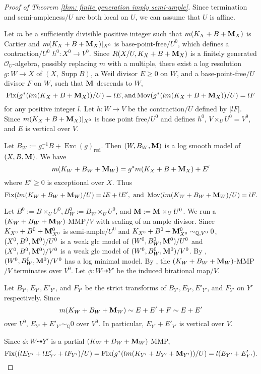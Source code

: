 \documentclass[11pt]{amsart}
\numberwithin{equation}{section}
\newcommand{\Mm}{{\bf{M}}}
\newcommand{\Qq}{\mathbb{Q}}
\newcommand{\Exc}{\operatorname{Exc}}
\newcommand{\Fix}{\operatorname{Fix}}
\newcommand{\Mov}{\operatorname{Mov}}
\newcommand{\Supp}{\operatorname{Supp}}
\newcommand{\Oo}{\mathcal{O}}
\theoremstyle{definition}
\theoremstyle{definition}
\theoremstyle{definition}
\begin{document}
\begin{proof}[Proof of Theorem \ref{thm: finite generation imply semi-ample}]
Since termination and semi-ampleness$/U$ are both local on $U$, we can assume that $U$ is affine.

Let $m$ be a sufficiently divisible positive integer such that $m(K_X+B+\Mm_X)$ is Cartier and $m(K_X+B+\Mm_X)|_{X^0}$ is base-point-free$/U^0$, which defines a contraction$/U^0$ $h^0: X^0\to V^0$. Since $R(X/U,K_X+B+\Mm_X)$ is a finitely
generated $\Oo_U$-algebra, possibly replacing $m$ with a multiple, there
exist a log resolution $g: W\to X$ of $(X,\Supp B)$, a Weil divisor $E\ge 0$ on $W$, and a base-point-free$/U$ divisor $F$ on $W$, such that $\Mm$ descends to $W$,
$$
\Fix(g^*(lm(K_X+B+\Mm_X))/U)=lE, \text{and}  \Mov(g^*(lm(K_X+B+\Mm_X))/U)=lF
$$
for any positive integer $l$. Let $h: W\rightarrow V$ be the
contraction$/U$ defined by $|lF|$. Since $m(K_X+B+\Mm_X)|_{X^0}$ is base point free$/U^0$ and defines $h^0$, $V\times_UU^0=V^0$, and $E$ is vertical over $V$.

Let $B_W:=g^{-1}_*B+\Exc(g)_{\text{red}}$. Then $(W,B_W,\Mm)$ is a log smooth model of $(X,B,\Mm)$. We have
$$
m(K_W+B_W+\Mm_W)=g^*m(K_X+B+\Mm_X)+E'
$$
where $E'\ge0$ is exceptional over $X$. Thus
$$
\Fix(lm(K_W+B_W+\Mm_W)/U)=lE+lE', \text{ and }\Mov(lm(K_W+B_W+\Mm_W)/U)=lF.
$$

Let $B^0:=B\times_UU^0, B_W^0:=B_W\times_UU^0$, and $\Mm:=\Mm\times_UU^0$. We run a $(K_W+B_W+\Mm_W)$-MMP$/V$ with scaling of an ample divisor. Since $K_{X^0}+B^0+\Mm^0_{X^0}$ is semi-ample$/U^0$ and $K_{X^0}+B^0+\Mm^0_{X^0}\sim_{\mathbb Q,V^0}0$, $(X^0,B^0,\Mm^0)/U^0$ is a weak glc model of $(W^0,B^0_W,\Mm^0)/U^0$ and $(X^0,B^0,\Mm^0)/V^0$ is a weak glc model of $(W^0,B^0_W,\Mm^0)/V^0$. By \cite[Lemma 3.15]{HL21a}, $(W^0,B^0_W,\Mm^0)/V^0$ has a log minimal
model. By \cite[Theorem 2.24]{HL21a}, the $(K_W+B_W+\Mm_W)$-MMP$/V$ terminates over $V^0$. Let $\phi: W\dashrightarrow Y'$ be the induced birational map$/V$. 

Let $B_{Y'},E_{Y'},E'_{Y'}$, and $F_{Y'}$ be the strict transforms of $B_{Y'},E_{Y'},E'_{Y'}$, and $F_{Y'}$ on $Y'$ respectively. Since
$$ m(K_W+B_W+\Mm_W)\sim E+E'+F\sim E+E'$$
over $V^0$, $E_{Y'}+E'_{Y'}\sim_\Qq 0$ over $V^0$. In particular, $E_{Y'}+E'_{Y'}$ is vertical over $V$. 

Since $\phi: W\dashrightarrow Y'$ is a partial $(K_W+B_W+\Mm_W)$-MMP, 
$$\Fix((lE_{Y'}+lE'_{Y'}+lF_{Y'})/U)=\Fix(g^*(lm(K_{Y'}+B_{Y'}+\Mm_{Y'}))/U)=l(E_{Y'}+E_{Y'}').$$


\end{proof}
\end{document}

